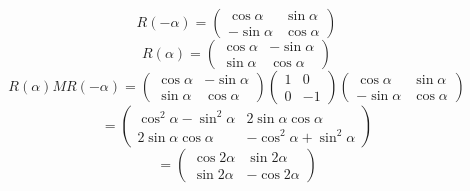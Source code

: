 \documentclass{jsarticle}
\begin{document}
{   $$ R(-\alpha) = \begin{pmatrix} \cos \alpha & \sin \alpha \\
   - \sin \alpha & \cos \alpha \end{pmatrix} $$
   $$ R(\alpha) = \begin{pmatrix} \cos \alpha & - \sin \alpha \\
   \sin \alpha & \cos \alpha \end{pmatrix} $$
   $$ R(\alpha)M R(-\alpha) = 
   \begin{pmatrix} \cos \alpha & - \sin \alpha \\
   \sin \alpha & \cos \alpha \end{pmatrix} \begin{pmatrix} 1 & 0 \\
   0 & - 1 \end{pmatrix} \begin{pmatrix} \cos \alpha & \sin \alpha \\
   - \sin \alpha & \cos \alpha \end{pmatrix} $$
   $$ = \begin{pmatrix} \cos^2 \alpha - \sin^2 \alpha & 2 \sin \alpha \cos 
	   \alpha \\
	   2 \sin \alpha \cos \alpha & - \cos^2 \alpha + \sin^2 \alpha
   \end{pmatrix} $$
   $$ = \begin{pmatrix} \cos 2 \alpha & \sin 2 \alpha \\
   \sin 2 \alpha & - \cos 2 \alpha \end{pmatrix} $$

}
\end{document}
